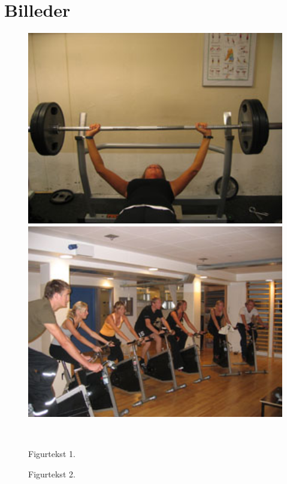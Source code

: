 \chapter{Billeder}

\begin{figure}[htbp]
\centering
\begin{minipage}[b]{0.48\textwidth}
\centering
\includegraphics[width=1.00\textwidth]{billeder/billede1.jpg} %
\end{minipage}
\hfill
\begin{minipage}[b]{0.48\textwidth}
\centering
\includegraphics[width=1.00\textwidth]{billeder/billede2.jpg} %
\end{minipage}
\\ %
\begin{minipage}[t]{0.48\textwidth}
\caption{Figurtekst 1.} %
\label{fig:billede1}
\end{minipage}
\hfill
\begin{minipage}[t]{0.48\textwidth}
\caption{Figurtekst 2.} %
\label{fig:billede2}
\end{minipage}
\end{figure}


